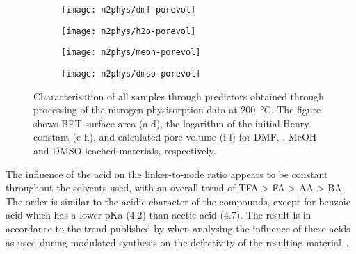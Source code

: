 \begin{figure}[htb]
    \begin{subfigure}{0.25\linewidth}
        \texttt{[image: n2phys/dmf-porevol]}%
        \caption{}%
        \label{def:fgr:n2phys-dmf-porevol}
    \end{subfigure}%
    \begin{subfigure}{0.25\linewidth}
        \texttt{[image: n2phys/h2o-porevol]}%
        \caption{}%
        \label{def:fgr:n2phys-h2o-porevol}
    \end{subfigure}%
    \begin{subfigure}{0.25\linewidth}
        \texttt{[image: n2phys/meoh-porevol]}%
        \caption{}%
        \label{def:fgr:n2phys-meoh-porevol}
    \end{subfigure}%
    \begin{subfigure}{0.25\linewidth}
        \texttt{[image: n2phys/dmso-porevol]}%
        \caption{}%
        \label{def:fgr:n2phys-dmso-porevol}
    \end{subfigure}%

    \caption{Characterisation of all samples through predictors
    obtained through processing of the nitrogen physisorption 
    data at \SI{200}{\degreeCelsius}. The figure shows BET surface
    area (a-d), the logarithm of the initial Henry constant (e-h), 
    and calculated pore volume (i-l) for DMF, , MeOH and 
    DMSO leached materials, respectively.}%
    \label{def:fgr:nitrogen-predictors}
    
\end{figure}

The influence of the acid on the linker-to-node ratio appears to be
constant throughout the solvents used, with an overall trend of 
TFA > FA > AA > BA. The order is similar
to the acidic character of the compounds, except for
benzoic acid which has a lower pKa (4.2) than acetic acid (4.7).
The result is in accordance to the trend published by 
\citeauthor{shearerDefectEngineeringTuning2016} when analysing
the influence of these acids as used during modulated synthesis on the
defectivity of the resulting material~\cite{shearerDefectEngineeringTuning2016}.

